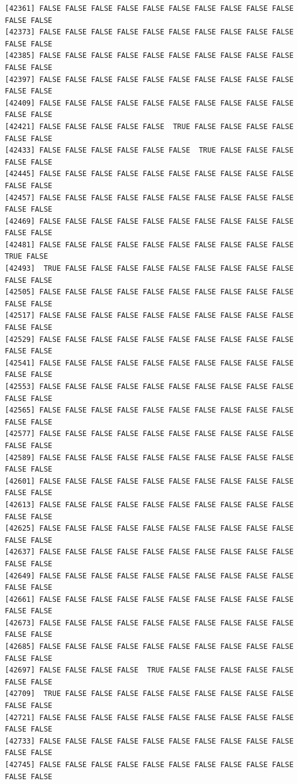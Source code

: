 \documentclass[
  a4paper,
  DIV=11,
  numbers=noendperiod]{scrartcl}
\begin{document}
\begin{verbatim}
[42361] FALSE FALSE FALSE FALSE FALSE FALSE FALSE FALSE FALSE FALSE FALSE FALSE
[42373] FALSE FALSE FALSE FALSE FALSE FALSE FALSE FALSE FALSE FALSE FALSE FALSE
[42385] FALSE FALSE FALSE FALSE FALSE FALSE FALSE FALSE FALSE FALSE FALSE FALSE
[42397] FALSE FALSE FALSE FALSE FALSE FALSE FALSE FALSE FALSE FALSE FALSE FALSE
[42409] FALSE FALSE FALSE FALSE FALSE FALSE FALSE FALSE FALSE FALSE FALSE FALSE
[42421] FALSE FALSE FALSE FALSE FALSE  TRUE FALSE FALSE FALSE FALSE FALSE FALSE
[42433] FALSE FALSE FALSE FALSE FALSE FALSE  TRUE FALSE FALSE FALSE FALSE FALSE
[42445] FALSE FALSE FALSE FALSE FALSE FALSE FALSE FALSE FALSE FALSE FALSE FALSE
[42457] FALSE FALSE FALSE FALSE FALSE FALSE FALSE FALSE FALSE FALSE FALSE FALSE
[42469] FALSE FALSE FALSE FALSE FALSE FALSE FALSE FALSE FALSE FALSE FALSE FALSE
[42481] FALSE FALSE FALSE FALSE FALSE FALSE FALSE FALSE FALSE FALSE  TRUE FALSE
[42493]  TRUE FALSE FALSE FALSE FALSE FALSE FALSE FALSE FALSE FALSE FALSE FALSE
[42505] FALSE FALSE FALSE FALSE FALSE FALSE FALSE FALSE FALSE FALSE FALSE FALSE
[42517] FALSE FALSE FALSE FALSE FALSE FALSE FALSE FALSE FALSE FALSE FALSE FALSE
[42529] FALSE FALSE FALSE FALSE FALSE FALSE FALSE FALSE FALSE FALSE FALSE FALSE
[42541] FALSE FALSE FALSE FALSE FALSE FALSE FALSE FALSE FALSE FALSE FALSE FALSE
[42553] FALSE FALSE FALSE FALSE FALSE FALSE FALSE FALSE FALSE FALSE FALSE FALSE
[42565] FALSE FALSE FALSE FALSE FALSE FALSE FALSE FALSE FALSE FALSE FALSE FALSE
[42577] FALSE FALSE FALSE FALSE FALSE FALSE FALSE FALSE FALSE FALSE FALSE FALSE
[42589] FALSE FALSE FALSE FALSE FALSE FALSE FALSE FALSE FALSE FALSE FALSE FALSE
[42601] FALSE FALSE FALSE FALSE FALSE FALSE FALSE FALSE FALSE FALSE FALSE FALSE
[42613] FALSE FALSE FALSE FALSE FALSE FALSE FALSE FALSE FALSE FALSE FALSE FALSE
[42625] FALSE FALSE FALSE FALSE FALSE FALSE FALSE FALSE FALSE FALSE FALSE FALSE
[42637] FALSE FALSE FALSE FALSE FALSE FALSE FALSE FALSE FALSE FALSE FALSE FALSE
[42649] FALSE FALSE FALSE FALSE FALSE FALSE FALSE FALSE FALSE FALSE FALSE FALSE
[42661] FALSE FALSE FALSE FALSE FALSE FALSE FALSE FALSE FALSE FALSE FALSE FALSE
[42673] FALSE FALSE FALSE FALSE FALSE FALSE FALSE FALSE FALSE FALSE FALSE FALSE
[42685] FALSE FALSE FALSE FALSE FALSE FALSE FALSE FALSE FALSE FALSE FALSE FALSE
[42697] FALSE FALSE FALSE FALSE  TRUE FALSE FALSE FALSE FALSE FALSE FALSE FALSE
[42709]  TRUE FALSE FALSE FALSE FALSE FALSE FALSE FALSE FALSE FALSE FALSE FALSE
[42721] FALSE FALSE FALSE FALSE FALSE FALSE FALSE FALSE FALSE FALSE FALSE FALSE
[42733] FALSE FALSE FALSE FALSE FALSE FALSE FALSE FALSE FALSE FALSE FALSE FALSE
[42745] FALSE FALSE FALSE FALSE FALSE FALSE FALSE FALSE FALSE FALSE FALSE FALSE

\end{verbatim}
\end{document}
